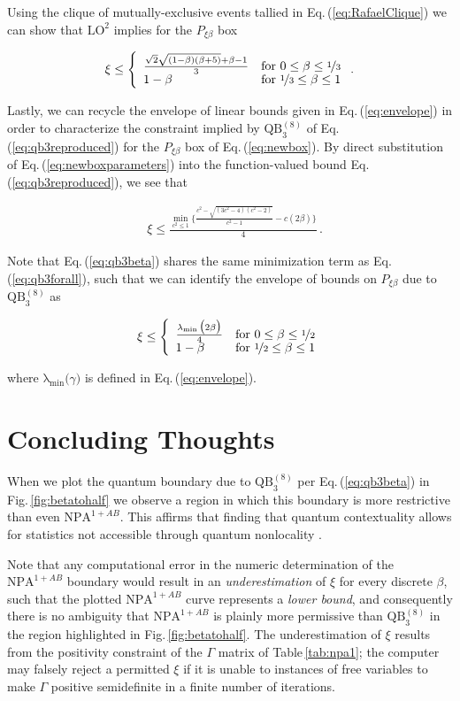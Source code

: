 \documentclass[
  12pt          %
  ,letterpaper  %
  ,center       %
  ,noupper      %
  ,english,fleqn]{uconnthesis}
\let\stdsection\section
\renewcommand\section{\newpage\stdsection}
\newcommand{\LeftEqns}[1]{\begin{fleqn}[\leftmargini minus \leftmargini]\begin{align}#1\end{align}\end{fleqn}}
\newcommand{\LeftEqn}[1]{\LeftEqns{\begin{split}#1\end{split}}}
\newcommand{\acases}[1]{{\renewcommand{\arraystretch}{0.75}\left\lbrace\begin{array}{ll} #1\end{array}\right.}}
\newcommand{\ceq}[1]{Eq.\,(\ref{#1})}
\newcommand{\fig}[1]{Fig.\,\ref{#1}}
\newcommand{\tab}[1]{Table\,\ref{#1}}
\begin{document}
Using the clique of mutually-exclusive events tallied in \ceq{eq:RafaelClique} we can show that $\mbox{LO}^2$ implies for the $P_{\xi \beta}$ box
\LeftEqn{
\xi \leq \acases{ \frac{\sqrt{2} \sqrt{(1-\beta ) (\beta +5)}+\beta-1}{3} & \text{for }0\leq \beta \leq \nicefrac{1}{3} \\ 1-\beta & \text{for }\nicefrac{1}{3} \leq \beta \leq 1 }\,.
}

Lastly, we can recycle the envelope of linear bounds given in \ceq{eq:envelope} in order to characterize the constraint implied by $\mbox{QB}_3^{(8)}$ of \ceq{eq:qb3reproduced} for the $P_{\xi \beta}$ box of \ceq{eq:newbox}. By direct substitution of \ceq{eq:newboxparameters} into the function-valued bound \ceq{eq:qb3reproduced}, we see that
\LeftEqns{\label{eq:qb3beta}
&\xi\leq \frac{\min\limits_{c^2 \leq 1}{\bigg\lbrace{\frac{c^2-\sqrt{\left(3 c^2-4\right) \left(c^2-2\right)}}{c^2-1}-c (2\beta)\bigg\rbrace}}}{4}\,.
}
Note that \ceq{eq:qb3beta} shares the same minimization term as \ceq{eq:qb3forall}, such that we can identify the envelope of bounds on $P_{\xi \beta}$ due to $\mbox{QB}_3^{(8)}$ as
\LeftEqn{
\xi \leq \acases{ \frac{\operatorname{\lambda_{\min}}{\big(2 \beta\big)}}{4} & \text{for }0\leq \beta \leq \nicefrac{1}{2} \\ 1-\beta & \text{for }\nicefrac{1}{2} \leq \beta \leq 1 }
}
where $\operatorname{\lambda_{\min}}{\big(\gamma\big)}$ is defined in \ceq{eq:envelope}.

\section{Concluding Thoughts}
When we plot the quantum boundary due to $\mbox{QB}_3^{(8)}$ per \ceq{eq:qb3beta} in \fig{fig:betatohalf} we observe a region in which this boundary is more restrictive than even $\mbox{NPA}^{1+AB}$. This affirms that finding that quantum contextuality allows for statistics not accessible through quantum nonlocality \cite{FritzCombinatorialLong,AlmostQuantum2}.

Note that any computational error in the numeric determination of the $\mbox{NPA}^{1+AB}$ boundary would result in an \emph{underestimation} of $\xi$ for every discrete $\beta$, such that the plotted $\mbox{NPA}^{1+AB}$ curve represents a \emph{lower bound}, and consequently there is no ambiguity that $\mbox{NPA}^{1+AB}$ is plainly more permissive than $\mbox{QB}_3^{(8)}$ in the region highlighted in \fig{fig:betatohalf}. The underestimation of $\xi$ results from the positivity constraint of the $\Gamma$ matrix of \tab{tab:npa1}; the computer may falsely reject a permitted $\xi$ if it is unable to instances of free variables to make $\Gamma$ positive semidefinite in a finite number of iterations.
\end{document}
